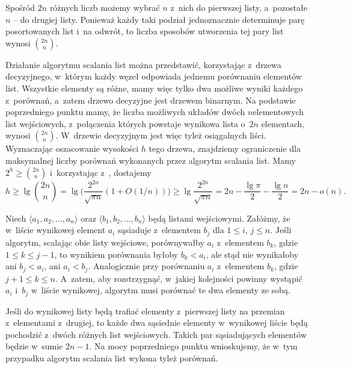 
\subproblem %
Spośród $2n$ różnych liczb możemy wybrać $n$ z~nich do pierwszej listy, a~pozostałe $n$ -- do drugiej listy.
Ponieważ każdy taki podział jednoznacznie determinuje parę posortowanych list i~na odwrót, to liczba sposobów utworzenia tej pary list wynosi $\binom{2n}{n}$.

\subproblem %
Działanie algorytmu scalania list można przedstawić, korzystając z~drzewa decyzyjnego, w~którym każdy węzeł odpowiada jednemu porównaniu elementów list.
Wszystkie elementy są różne, mamy więc tylko dwa możliwe wyniki każdego z~porównań, a~zatem drzewo decyzyjne jest drzewem binarnym.
Na podstawie poprzedniego punktu mamy, że liczba możliwych układów dwóch $n$\nbhyphen elementowych list wejściowych, z~połączenia których powstaje wynikowa lista o~$2n$ elementach, wynosi $\binom{2n}{n}$.
W~drzewie decyzyjnym jest więc tyleż osiągalnych liści.
Wyznaczając oszacowanie wysokości $h$ tego drzewa, znajdziemy ograniczenie dla maksymalnej liczby porównań wykonanych przez algorytm scalania list.
Mamy $2^h\ge\binom{2n}{n}$ i~korzystając z~, dostajemy
\[
    h \ge \lg\binom{2n}{n} = \lg\biggl(\frac{2^{2n}}{\sqrt{\pi n}}(1+O(1/n))\biggr) \ge \lg\frac{2^{2n}}{\sqrt{\pi n}} = 2n-\frac{\lg\pi}{2}-\frac{\lg n}{2} = 2n-o(n).
\]

\subproblem %
Niech $\langle a_1,a_2,\dots,a_n\rangle$ oraz $\langle b_1,b_2,\dots,b_n\rangle$ będą listami wejściowymi.
Załóżmy, że w~liście wynikowej element $a_i$ sąsiaduje z~elementem $b_j$ dla $1\le i$, $j\le n$.
Jeśli algorytm, scalając obie listy wejściowe, porównywałby $a_i$ z~elementem $b_k$, gdzie $1\le k\le j-1$, to wynikiem porównania byłoby $b_k<a_i$, ale stąd nie wynikałoby ani $b_j<a_i$, ani $a_i<b_j$.
Analogicznie przy porównaniu $a_i$ z~elementem $b_k$, gdzie $j+1\le k\le n$.
A~zatem, aby rozstrzygnąć, w~jakiej kolejności powinny wystąpić $a_i$ i~$b_j$ w~liście wynikowej, algorytm musi porównać te dwa elementy ze sobą.

\subproblem %
Jeśli do wynikowej listy będą trafiać elementy z~pierwszej listy na przemian z~elementami z~drugiej, to każde dwa sąsiednie elementy w~wynikowej liście będą pochodzić z~dwóch różnych list wejściowych.
Takich par sąsiadujących elementów będzie w~sumie $2n-1$.
Na mocy poprzedniego punktu wnioskujemy, że w~tym przypadku algorytm scalania list wykona tyleż porównań.
